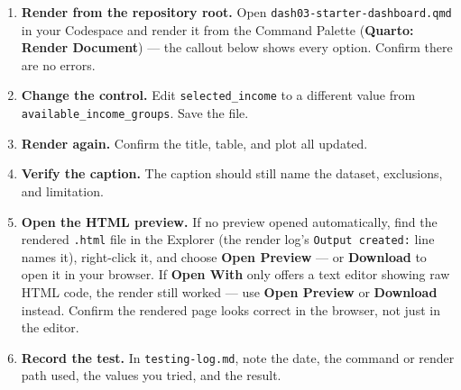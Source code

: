 \documentclass[
  letterpaper,
  DIV=11,
  numbers=noendperiod,
  oneside]{scrreprt}
\providecommand{\tightlist}{%
  \setlength{\itemsep}{0pt}\setlength{\parskip}{0pt}}
\begin{document}
\begin{enumerate}
\def\labelenumi{\arabic{enumi}.}
\tightlist
\item
  \textbf{Render from the repository root.} Open
  \texttt{dash03-starter-dashboard.qmd} in your Codespace and render it
  from the Command Palette (\textbf{Quarto: Render Document}) --- the
  callout below shows every option. Confirm there are no errors.
\item
  \textbf{Change the control.} Edit \texttt{selected\_income} to a
  different value from \texttt{available\_income\_groups}. Save the
  file.
\item
  \textbf{Render again.} Confirm the title, table, and plot all updated.
\item
  \textbf{Verify the caption.} The caption should still name the
  dataset, exclusions, and limitation.
\item
  \textbf{Open the HTML preview.} If no preview opened automatically,
  find the rendered \texttt{.html} file in the Explorer (the render
  log's \texttt{Output\ created:} line names it), right-click it, and
  choose \textbf{Open Preview} --- or \textbf{Download} to open it in
  your browser. If \textbf{Open With} only offers a text editor showing
  raw HTML code, the render still worked --- use \textbf{Open Preview}
  or \textbf{Download} instead. Confirm the rendered page looks correct
  in the browser, not just in the editor.
\item
  \textbf{Record the test.} In \texttt{testing-log.md}, note the date,
  the command or render path used, the values you tried, and the result.
\end{enumerate}
\end{document}
